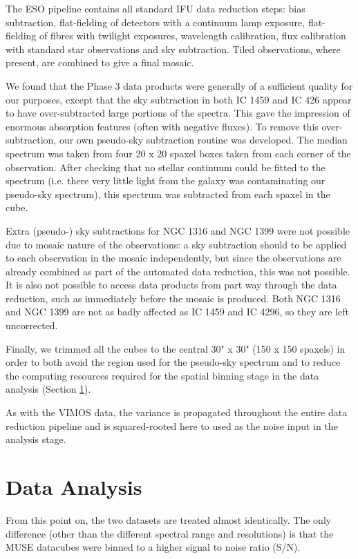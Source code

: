 		The ESO pipeline contains all standard IFU data reduction steps: bias subtraction, flat-fielding of detectors with a continuum lamp exposure, flat-fielding of fibres with twilight exposures, wavelength calibration, flux calibration with standard star observations and sky subtraction. Tiled observations, where present, are combined to give a final mosaic.

		We found that the Phase 3 data products were generally of a sufficient quality for our purposes, except that the sky subtraction in both IC 1459 and IC 426 appear to have over-subtracted large portions of the spectra. This gave the impression of enormous absorption features (often with negative fluxes). To remove this over-subtraction, our own pseudo-sky subtraction routine was developed. The median spectrum was taken from four 20 x 20 spaxel boxes taken from each corner of the observation. After checking that no stellar continuum could be fitted to the spectrum (i.e. there very little light from the galaxy was contaminating our pseudo-sky spectrum), this spectrum was subtracted from each spaxel in the cube. 

		Extra (pseudo-) sky subtractions for NGC 1316 and NGC 1399 were not possible due to mosaic nature of the observations: a sky subtraction should to be applied to each observation in the mosaic independently, but since the observations are already combined as part of the automated data reduction, this was not possible. It is also not possible to access data products from part way through the data reduction, such as immediately before the mosaic is produced. Both NGC 1316 and NGC 1399 are not as badly affected as IC 1459 and IC 4296, so they are left uncorrected. 

		Finally, we trimmed all the cubes to the central 30" x 30" (150 x 150 spaxels) in order to both avoid the region used for the pseudo-sky spectrum and to reduce the computing resources required for the spatial binning stage in the data analysis (Section \ref{sec:analysis}). 

		As with the VIMOS data, the variance is propagated throughout the entire data reduction pipeline and is squared-rooted here to used as the noise input in the analysis stage. 
\section{Data Analysis}
	\label{sec:analysis}
	From this point on, the two datasets are treated almost identically. The only difference (other than the different spectral range and resolutions) is that the MUSE datacubes were binned to a higher signal to noise ratio (S/N).



